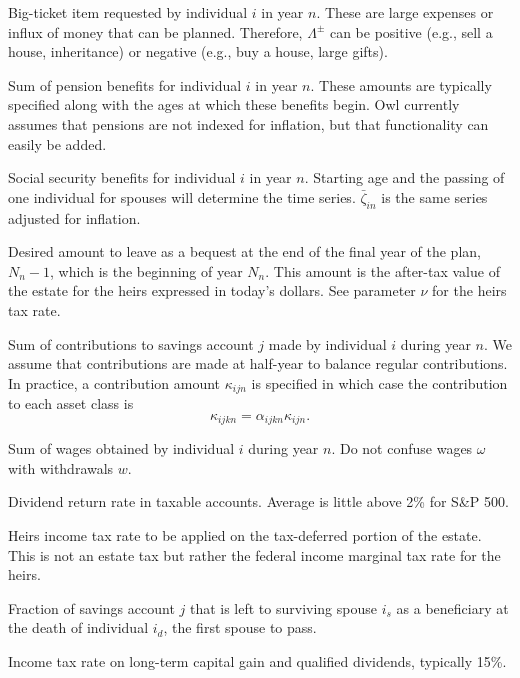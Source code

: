 \documentclass{report}[fleqn,12pt]
\begin{document}
\begin{description}[leftmargin=4em,style=multiline]
\item [$\Lambda^\pm_{in}$]
	Big-ticket item requested by individual $i$ in year $n$.
	These are large expenses or influx of money
	that can be planned. Therefore, $\Lambda^\pm$ can be positive
	(e.g., sell a house, inheritance) or negative (e.g., buy a house, large gifts).
\item [$\pi_{in}$]
	Sum of pension benefits for individual $i$ in year $n$. These amounts are typically
	specified along with the ages at which these benefits begin. Owl currently assumes
	that pensions are not indexed for inflation, but that functionality can easily be added.
\item [$\zeta_{in}$]
	Social security benefits for individual $i$ in year $n$. Starting age and the passing
	of one individual for spouses will determine the time series. $\bar{\zeta}_{in}$ is
	the same series adjusted for inflation.
\item [$\epsilon_{N_n}$]
	Desired amount to leave as a bequest at the end of the final year of the plan, $N_n-1$,
	which is the beginning of year $N_n$. This amount is the after-tax value of the estate
	for the heirs expressed in today's dollars. See parameter $\nu$ for the heirs tax rate.
\item [$\kappa_{ijn}$]
	Sum of contributions to savings account $j$ made by individual $i$ during year $n$.
	We assume that contributions are made at half-year to balance regular contributions.
	In practice, a contribution
	amount $\kappa_{ijn}$ is specified in which case the contribution to each asset
	class is
	\begin{equation}
		\kappa_{ijkn} = \alpha_{ijkn}\kappa_{ijn}.
	\end{equation}
\item [$\omega_{in}$]
	Sum of wages obtained by individual $i$ during year $n$.
	Do not confuse wages $\omega$ with withdrawals $w$.
\item [$\mu$]
	Dividend return rate in taxable accounts. Average is little above 2\% for S\&P 500.
\item [$\nu$]
	Heirs income tax rate to be applied on the tax-deferred portion of the estate. This is not an estate tax
	but rather the federal income marginal tax rate for the heirs.
\item [$\phi_j$]
	Fraction of savings account $j$ that is left to surviving spouse $i_s$ as a beneficiary
	at the death of individual $i_d$, the first spouse to pass.
\item [$\psi$]
	Income tax rate on long-term capital gain and qualified dividends, typically 15\%.

\end{description}
\end{document}
